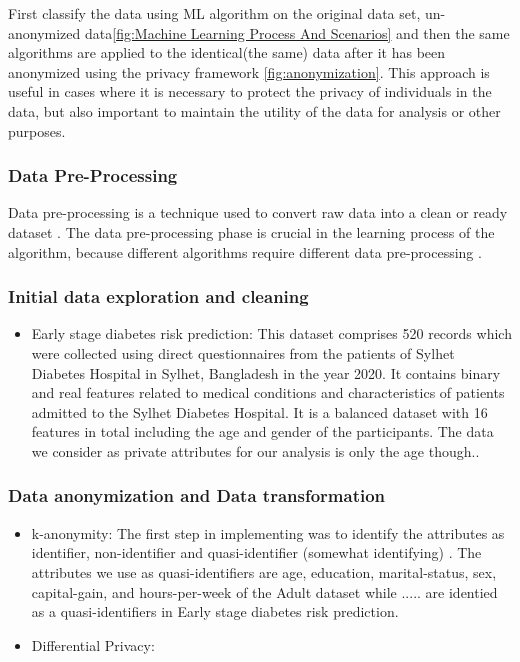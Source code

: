 First classify the data using ML algorithm on the original data set, un-anonymized data\ref{fig:Machine Learning Process And Scenarios} and then the same algorithms are applied to the identical(the same) data after it has been anonymized using the privacy framework \ref{fig:anonymization}. This approach is useful in cases where it is necessary to protect the privacy of individuals in the data, but also important to maintain the utility of the data for analysis or other purposes\cite{wimmer2014comparison}.\\
\subsubsection{Data Pre-Processing}
Data pre-processing is a technique used to convert raw data into a clean or ready dataset \cite{han2012}. The data pre-processing phase is crucial in the learning process of the algorithm, because different algorithms require different data pre-processing \cite{han2012}.  
\subsubsection{Initial data exploration and cleaning}
\begin{itemize}
    \item Early stage diabetes risk prediction: This dataset comprises 520 records which were collected using direct questionnaires from the patients of Sylhet Diabetes Hospital in Sylhet, Bangladesh in the year 2020. It contains binary and real features related to medical conditions and characteristics of patients admitted to the Sylhet Diabetes Hospital. It is a balanced dataset with 16 features in total including the age and gender of the participants. The data we consider as private attributes for our analysis is only the age though..
\end{itemize}
\subsubsection{Data anonymization and Data transformation}
\begin{itemize}
    \item k-anonymity: The first step in implementing was to identify the attributes as identifier, non-identifier and quasi-identifier (somewhat identifying) . The attributes we use as quasi-identifiers are age, education, marital-status, sex, capital-gain, and hours-per-week of the Adult dataset while ..... are identied as a quasi-identifiers in Early stage diabetes risk prediction.
    \item Differential Privacy:
\end{itemize}
